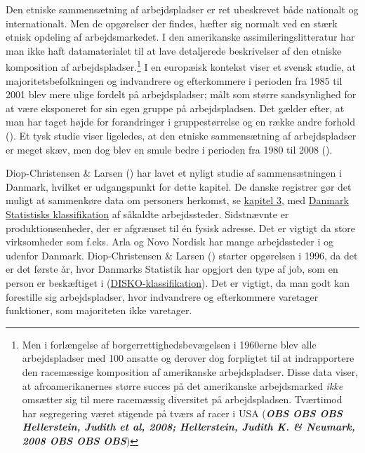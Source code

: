 \documentclass[
]{book}
\begin{document}
Den etniske sammensætning af arbejdspladser er ret ubeskrevet både nationalt og internationalt. Men de opgørelser der findes, hæfter sig normalt ved en stærk etnisk opdeling af arbejdsmarkedet. I den amerikanske assimileringslitteratur har man ikke haft datamaterialet til at lave detaljerede beskrivelser af den etniske komposition af arbejdspladser.\footnote{Men i forlængelse af borgerrettighedsbevægelsen i 1960erne blev alle arbejdspladser med 100 ansatte og derover dog forpligtet til at indrapportere den racemæssige komposition af amerikanske arbejdspladser. Disse data viser, at afroamerikanernes større succes på det amerikanske arbejdsmarked \emph{ikke} omsætter sig til mere racemæssig diversitet på arbejdspladsen. Tværtimod har segregering været stigende på tværs af racer i USA (\textbf{\emph{OBS OBS OBS Hellerstein, Judith et al, 2008; Hellerstein, Judith K. \& Neumark, 2008 OBS OBS OBS}})} I en europæisk kontekst viser et svensk studie, at majoritetsbefolkningen og indvandrere og efterkommere i perioden fra 1985 til 2001 blev mere ulige fordelt på arbejdspladser; målt som større sandsynlighed for at være eksponeret for sin egen gruppe på arbejdspladsen. Det gælder efter, at man har taget højde for forandringer i gruppestørrelse og en række andre forhold (). Et tysk studie viser ligeledes, at den etniske sammensætning af arbejdspladser er meget skæv, men dog blev en smule bedre i perioden fra 1980 til 2008 ().

Diop-Christensen \& Larsen () har lavet et nyligt studie af sammensætningen i Danmark, hvilket er udgangspunkt for dette kapitel. De danske registrer gør det muligt at sammenkøre data om personers herkomst, se \hyperref[kap3]{kapitel 3}, med \href{https://www.dst.dk/Site/Dst/SingleFiles/GetArchiveFile.aspx?fi=659482655935&fo=0&ext=kvaldel}{Danmark Statistisks klassifikation} af såkaldte arbejdssteder. Sidstnævnte er produktionsenheder, der er afgrænset til én fysisk adresse. Det er vigtigt da store virksomheder som f.eks. Arla og Novo Nordisk har mange arbejdssteder i og udenfor Danmark. Diop-Christensen \& Larsen () starter opgørelsen i 1996, da det er det første år, hvor Danmarks Statistik har opgjort den type af job, som en person er beskæftiget i (\href{https://www.dst.dk/Site/Dst/SingleFiles/GetArchiveFile.aspx?fi=2299282738&fo=0&ext=kvaldel}{DISKO-klassifikation}). Det er vigtigt, da man godt kan forestille sig arbejdspladser, hvor indvandrere og efterkommere varetager funktioner, som majoriteten ikke varetager.
\end{document}
